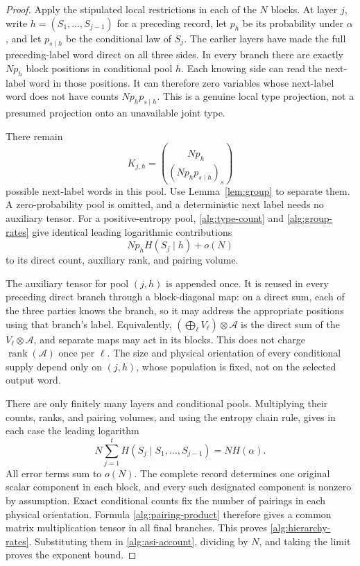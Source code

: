 \documentclass[11pt]{article}
\numberwithin{equation}{section}
\theoremstyle{definition}
\theoremstyle{remark}
\begin{document}
\begin{proof}
Apply the stipulated local restrictions in each of the \(N\) blocks.
At layer \(j\), write \(h=(S_1,\ldots,S_{j-1})\) for a preceding
record, let \(p_h\) be its probability under \(\alpha\), and let
\(p_{s\mid h}\) be the conditional law of \(S_j\).
The earlier layers have made the full preceding-label word direct on all
three sides.  In every branch there are exactly \(Np_h\) block positions
in conditional pool \(h\).  Each knowing side can read the next-label
word in those positions.  It can therefore zero variables whose next-label
word does not have counts \(Np_hp_{s\mid h}\).  This is a genuine local
type projection, not a presumed projection onto an unavailable joint type.

There remain
\[
 K_{j,h}=\binom{Np_h}{(Np_hp_{s\mid h})_s}
\]
possible next-label words in this pool.  Use Lemma~\ref{lem:group} to
separate them.  A zero-probability pool is omitted, and a deterministic
next label needs no auxiliary tensor.  For a positive-entropy pool,
\eqref{alg:type-count} and \eqref{alg:group-rates} give identical leading
logarithmic contributions
\[
 Np_h H(S_j\mid h)+o(N)
\]
to its direct count, auxiliary rank, and pairing volume.

The auxiliary tensor for pool \((j,h)\) is appended once.  It is reused
in every preceding direct branch through a block-diagonal map: on a direct
sum, each of the three parties knows the branch, so it may address the
appropriate positions using that branch's label.  Equivalently,
\((\bigoplus_\ell V_\ell)\otimes\mathcal A\) is the direct sum of the
\(V_\ell\otimes\mathcal A\), and separate maps may act in its blocks.
This does not charge \(\operatorname{rank}(\mathcal A)\) once per \(\ell\).
The size and physical orientation of every conditional supply depend only
on \((j,h)\), whose population is fixed, not on the selected output word.

There are only finitely many layers and conditional pools.  Multiplying
their counts, ranks, and pairing volumes, and using the entropy chain rule,
gives in each case the leading logarithm
\[
 N\sum_{j=1}^t H(S_j\mid S_1,\ldots,S_{j-1})=NH(\alpha).
\]
All error terms sum to \(o(N)\).  The complete record determines one
original scalar component in each block, and every such designated
component is nonzero by assumption.  Exact conditional counts fix the
number of pairings in each physical orientation.  Formula
\eqref{alg:pairing-product} therefore gives a common matrix multiplication
tensor in all final branches.  This proves \eqref{alg:hierarchy-rates}.
Substituting them in \eqref{alg:asi-account}, dividing by \(N\), and taking
the limit proves the exponent bound.
\end{proof}
\end{document}
